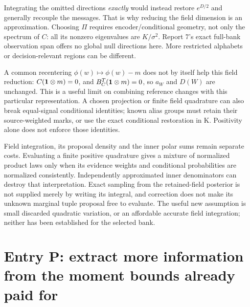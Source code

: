 \documentclass[10pt,a4paper]{article}
\begin{document}
Integrating the omitted directions \emph{exactly} would instead restore $e^{D/2}$ and generally recouple
the messages. That is why reducing the field dimension is an approximation. Choosing $\Pi$ requires
encoder/conditional geometry, not only the spectrum of $C$: all its nonzero eigenvalues are $K/\sigma^2$.
Report 7's exact full-bank observation span offers no global null directions here. More restricted
alphabets or decision-relevant regions can be different.

A common recentering $\phi(w)\mapsto\phi(w)-m$ does not by itself help this field reduction:
$C(\mathbf{1}\otimes m)=0$, and $B_C^T(\mathbf{1}\otimes m)=0$, so $a_W$ and $D(W)$ are unchanged.
This is a useful limit on combining reference changes with this particular representation.
A chosen projection or finite field quadrature can also break equal-signal conditional identities;
known alias groups must retain their source-weighted marks, or use the exact conditional restoration in K.
Positivity alone does not enforce those identities.

Field integration, its proposal density and the inner polar sums remain separate costs. Evaluating a finite
positive quadrature gives a mixture of normalized product laws only when its evidence weights and
conditional probabilities are normalized consistently. Independently approximated inner denominators can
destroy that interpretation. Exact sampling from the retained-field posterior is not supplied merely by
writing its integral, and correction does not make its unknown marginal tuple proposal free to evaluate.
The useful new assumption is small discarded quadratic variation, or an affordable accurate field
integration; neither has been established for the selected bank.

\clearpage
\section{Entry P: extract more information from the moment bounds already paid for}
\label{sec:moment-consistency}
\end{document}
